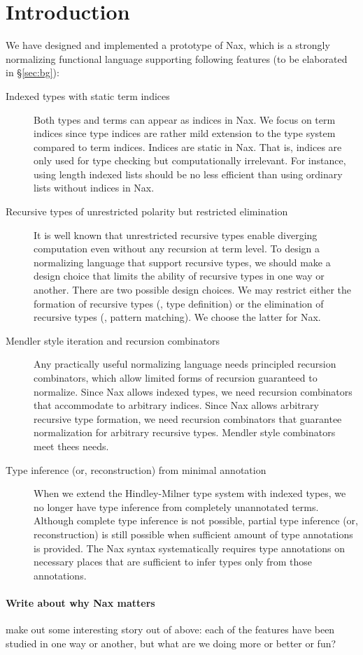 \section{Introduction}

We have designed and implemented a prototype of Nax, which is
a strongly normalizing functional language supporting following features
(to be elaborated in \S\ref{sec:bg}):
\begin{description}
\item[Indexed types with static term indices]
Both types and terms can appear as indices in Nax.
We focus on term indices since type indices are rather mild extension to
the type system compared to term indices.
Indices are static in Nax. That is, indices are only used for type checking
but computationally irrelevant. For instance, using length indexed lists
should be no less efficient than using ordinary lists without indices in Nax.

\item[Recursive types of unrestricted polarity but restricted elimination]
It is well known that unrestricted recursive types enable diverging computation
even without any recursion at term level. To design a normalizing language
that support recursive types, we should make a design choice that limits
the ability of recursive types in one way or another. There are two possible
design choices. We may restrict either the formation of recursive types
(\ie, type definition) or the elimination of recursive types
(\ie, pattern matching). We choose the latter for Nax.

\item[Mendler style iteration and recursion combinators]
Any practically useful normalizing language needs principled recursion
combinators, which allow limited forms of recursion guaranteed to normalize.
Since Nax allows indexed types, we need recursion combinators that accommodate
to arbitrary indices. Since Nax allows arbitrary recursive type formation,
we need recursion combinators that guarantee normalization for arbitrary
recursive types. Mendler style combinators meet thees needs.

\item[Type inference (or, reconstruction) from minimal annotation]
When we extend the Hindley-Milner type system with indexed types, we no longer
have type inference from completely unannotated terms. Although complete
type inference is not possible, partial type inference (or, reconstruction) is
still possible when sufficient amount of type annotations is provided.
The Nax syntax systematically requires type annotations on necessary places
that are sufficient to infer types only from those annotations.
\end{description}

\paragraph{Write about why Nax matters}
make out some interesting story out of above:
each of the features have been studied in one way or another,
but what are we doing more or better or fun?

